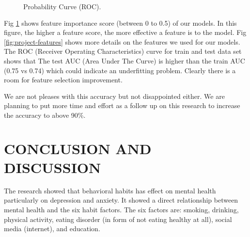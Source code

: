 \documentclass[letterpaper, 10 pt, conference]{ieeeconf}  %
\begin{document}
\begin{figure}[!htb]
        \caption{\label{fig:featureImportance} Probability Curve (ROC).}
\end{figure}

Fig \ref{fig:featureImportance} shows feature importance score (between 0 to 0.5) of our models. 
In this figure, the higher a feature score, the more effective a feature is to the model. 
Fig \ref{fig:project-features} shows more details on the features we used for our models. 
The ROC (Receiver Operating Characteristics) curve for train and test data set shows that 
The test AUC (Area Under The Curve) is higher than the train AUC (0.75 vs 0.74) which 
could indicate an underfitting problem. Clearly there is a room for feature selection improvement. 


We are not pleases with this accuracy but not disappointed either. We are planning to put more time and effort
as a follow up on this research to increase the accuracy to above 90\%.  


\section{CONCLUSION AND DISCUSSION}
The research showed that behavioral habits has effect on mental health particularly on depression and anxiety. 
It showed a direct relationship between mental health and the six habit factors. The six factors are: 
smoking, drinking, physical activity, eating disorder (in form of not eating healthy at all), social media (internet), and education.
\end{document}
